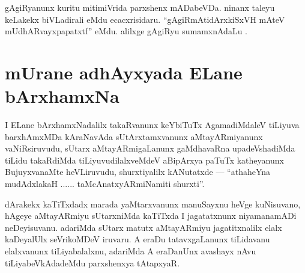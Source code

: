 \begin{artha}
gAgiRyanunx kuritu mitimiVrida parxshenx mADabeVDa. ninanx taleyu keLakekx biVLadirali eMdu ecacxrisidaru. ``gAgiRmAtidArxkiSxVH mAteV mUdhARvayxpapatxtf'' eMdu. alilxge gAgiRyu sumamxnAdaLu .
\end{artha}


\section*{mUrane adhAyxyada ELane bArxhamxNa}


\begin{artha}
I ELane bArxhamxNadalilx takaRvanunx keYbiTuTx AgamadiMdaleV tiLiyuva barxhAmxMDa kAraNavAda sUtArxtamxvanunx aMtayARmiyanunx vaNiRsiruvudu, sUtarx aMtayARmigaLanunx gaMdhavaRna upadeVshadiMda tiLidu takaRdiMda tiLiyuvudilalxveMdeV aBipArxya paTuTx katheyanunx BujuyxvanaMte heVLiruvudu, shurxtiyalilx kANutatxde --- ``athaheYna mudAdxlakaH ...... taMcAnatxyARmiNamiti shurxti''.
\end{artha}


\begin{artha}
dArakekx kaTiTxdadx marada yaMtarxvanunx manuSayxnu heVge kuNisuvano, hAgeye aMtayARmiyu sUtarxniMda kaTiTxda I jagatatxnunx niyamanamADi neDeyisuvanu. adariMda sUtarx matutx aMtayARmiyu jagatitxnalilx elalx kaDeyalUlx seVrikoMDeV iruvaru. A eraDu tatavxgaLanunx tiLidavanu elalxvanunx tiLiyabalalxnu, adariMda A eraDanUnx avashayx nAvu tiLiyabeVkAdadeMdu parxshenxya tAtapxyaR.
\end{artha}


